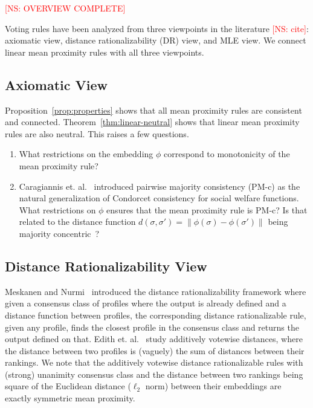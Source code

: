 \documentclass[10pt,letterpaper]{article}
\newcommand{\kibitz}[2]{\ifnum\Comments=1\textcolor{#1}{#2}\fi}
\newcommand{\cns}[1]{\kibitz{red} {[NS: #1]}}
\begin{document}
\cns{OVERVIEW COMPLETE}

Voting rules have been analyzed from three viewpoints in the literature \cns{cite}: axiomatic view, distance rationalizability (DR) view, and MLE view. We connect linear mean proximity rules with all three viewpoints.


\subsection{Axiomatic View}
Proposition~\ref{prop:properties} shows that all mean proximity rules are consistent and connected. Theorem~\ref{thm:linear-neutral} shows that linear mean proximity rules are also neutral. This raises a few questions.

\begin{enumerate}
\item What restrictions on the embedding $\phi$ correspond to monotonicity of the mean proximity rule?
\item Caragiannis et. al.~\cite{CPS13} introduced pairwise majority consistency (PM-c) as the natural generalization of Condorcet consistency for social welfare functions. What restrictions on $\phi$ ensures that the mean proximity rule is PM-c? Is that related to the distance function $d(\sigma,\sigma') = \|\phi(\sigma)-\phi(\sigma')\|$ being majority concentric~\cite{CPS13}?
\end{enumerate}


\subsection{Distance Rationalizability View}
Meskanen and Nurmi~\cite{MN08} introduced the distance rationalizability framework where given a consensus class of profiles where the output is already defined and a distance function between profiles, the corresponding distance rationalizable rule, given any profile, finds the closest profile in the consensus class and returns the output defined on that. Edith et. al.~\cite{EFS10} study additively votewise distances, where the distance between two profiles is (vaguely) the sum of distances between their rankings. We note that the additively votewise distance rationalizable rules with (strong) unanimity consensus class and the distance between two rankings being square of the Euclidean distance ($\ell_2$ norm) between their embeddings are exactly symmetric mean proximity. 
\end{document}
